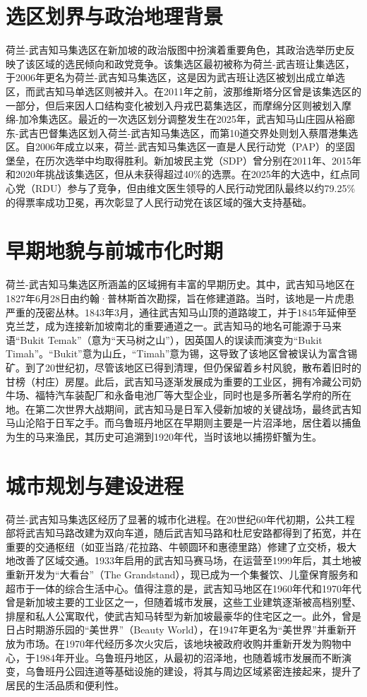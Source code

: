 \documentclass[11pt,a4paper,twoside,openany]{book}
\begin{document}
\section{选区划界与政治地理背景}
荷兰-武吉知马集选区在新加坡的政治版图中扮演着重要角色，其政治选举历史反映了该区域的选民倾向和政党竞争。该集选区最初被称为荷兰-武吉班让集选区，于2006年更名为荷兰-武吉知马集选区，这是因为武吉班让选区被划出成立单选区，而武吉知马单选区则被并入。在2011年之前，波那维斯塔分区曾是该集选区的一部分，但后来因人口结构变化被划入丹戎巴葛集选区，而摩绵分区则被划入摩绵-加冷集选区。最近的一次选区划分调整发生在2025年，武吉知马山庄园从裕廊东-武吉巴督集选区划入荷兰-武吉知马集选区，而第10道交界处则划入蔡厝港集选区。自2006年成立以来，荷兰-武吉知马集选区一直是人民行动党（PAP）的坚固堡垒，在历次选举中均取得胜利。新加坡民主党（SDP）曾分别在2011年、2015年和2020年挑战该集选区，但从未获得超过40\%的选票。在2025年的大选中，红点同心党（RDU）参与了竞争，但由维文医生领导的人民行动党团队最终以约79.25\%的得票率成功卫冕，再次彰显了人民行动党在该区域的强大支持基础。

\section{早期地貌与前城市化时期}
荷兰-武吉知马集选区所涵盖的区域拥有丰富的早期历史。其中，武吉知马地区在1827年6月28日由约翰·普林斯首次勘探，旨在修建道路。当时，该地是一片虎患严重的茂密丛林。1843年3月，通往武吉知马山顶的道路竣工，并于1845年延伸至克兰芝，成为连接新加坡南北的重要通道之一。武吉知马的地名可能源于马来语“Bukit Temak”（意为“天马树之山”），因英国人的误读而演变为“Bukit Timah”。“Bukit”意为山丘，“Timah”意为锡，这导致了该地区曾被误认为富含锡矿。到了20世纪初，尽管该地区已得到清理，但仍保留着乡村风貌，散布着旧时的甘榜（村庄）房屋。此后，武吉知马逐渐发展成为重要的工业区，拥有冷藏公司奶牛场、福特汽车装配厂和永备电池厂等大型企业，同时也是多所著名学府的所在地。在第二次世界大战期间，武吉知马是日军入侵新加坡的关键战场，最终武吉知马山沦陷于日军之手。而乌鲁班丹地区在早期则主要是一片沼泽地，居住着以捕鱼为生的马来渔民，其历史可追溯到1920年代，当时该地以捕捞虾蟹为生。

\section{城市规划与建设进程}
荷兰-武吉知马集选区经历了显著的城市化进程。在20世纪60年代初期，公共工程部将武吉知马路改建为双向车道，随后武吉知马路和杜尼安路都得到了拓宽，并在重要的交通枢纽（如亚当路/花拉路、牛顿圆环和惠德里路）修建了立交桥，极大地改善了区域交通。1933年启用的武吉知马赛马场，在运营至1999年后，其土地被重新开发为“大看台”（The Grandstand），现已成为一个集餐饮、儿童保育服务和超市于一体的综合生活中心。值得注意的是，武吉知马地区在1960年代和1970年代曾是新加坡主要的工业区之一，但随着城市发展，这些工业建筑逐渐被高档别墅、排屋和私人公寓取代，使武吉知马转型为新加坡最豪华的住宅区之一。此外，曾是日占时期游乐园的“美世界”（Beauty World），在1947年更名为“美世界”并重新开放为市场。在1970年代经历多次火灾后，该地块被政府收购并重新开发为购物中心，于1984年开业。乌鲁班丹地区，从最初的沼泽地，也随着城市发展而不断演变，乌鲁班丹公园连道等基础设施的建设，将其与周边区域紧密连接起来，提升了居民的生活品质和便利性。
\end{document}
